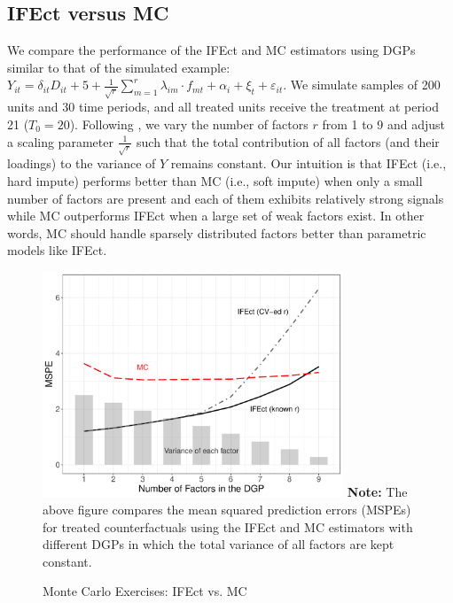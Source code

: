\documentclass[12pt]{article}
\let\oldcenter\center
\let\oldendcenter\endcenter
\renewenvironment{center}{\setlength\topsep{0pt}\oldcenter}{\oldendcenter}
\begin{document}
\subsection{IFEct versus MC}

We compare the performance of the IFEct and MC estimators using DGPs similar to that of the simulated example: $Y_{it} = \delta_{it} D_{it} + 5 + \frac{1}{\sqrt{r}}\sum_{m=1}^{r} \lambda_{im} \cdot f_{mt} + \alpha_{i} + \xi_{t} + \varepsilon_{it}.$ We simulate samples of 200 units and 30 time periods, and all treated units receive the treatment at period 21 ($T_{0}= 20$). Following \citet{li2018inference}, we vary the number of factors $r$ from 1 to 9 and adjust a scaling parameter $\frac{1}{\sqrt{r}}$ such that the total contribution of all factors (and their loadings) to the variance of $Y$ remains constant. Our intuition is that IFEct (i.e., hard impute) performs better than MC (i.e., soft impute) when only a small number of factors are present and each of them exhibits relatively strong signals while MC outperforms IFEct when a large set of weak factors exist. In other words, MC should handle sparsely distributed factors better than parametric models like IFEct. 
\begin{figure}[!ht]
\caption{Monte Carlo Exercises: IFEct vs. MC}\label{fg:sim.estimators}
\centering
\begin{minipage}{0.95\linewidth}
\begin{center}
\includegraphics[width = 0.8\textwidth]{sim_compare.pdf}
\end{center}
\footnotesize\textbf{Note:} The above figure compares the mean squared prediction errors (MSPEs) for treated counterfactuals using the IFEct and MC estimators with different DGPs in which the total variance of all factors are kept constant. 
\end{minipage}
\end{figure}
\end{document}
